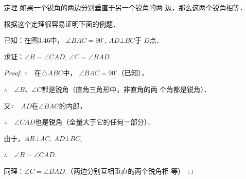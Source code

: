 \begin{blk}
   {定理} 如果一个锐角的两边分别垂直于另一个锐角的两
边，那么这两个锐角相等． 
\end{blk}

根据这个定理很容易证明下面的例题．

\begin{example}
已知：在图3.46中，
$\angle BAC=90^{\circ}$, $AD\bot BC$于
$D$点．

求证：$\angle B=\angle CAD$, $\angle C=\angle BAD$.
\end{example}


\begin{proof}
$\because\quad $在$\triangle ABC$中，
$\angle BAC=90^{\circ}$（已知），

$\therefore\quad \angle B$、$\angle C$都是锐角（直角三角形中，非直角的两
个角都是锐角）．

又$\because\quad AD$在$\angle BAC$的内部，

$\therefore\quad \angle CAD$也是锐角（全量大于它的任何一部分）．

由于，$AB\bot AC$, $AD\bot BC$, 

$\therefore\quad \angle B=\angle CAD$.

同理：$\angle C=\angle BAD$.（两边分别互相垂直的两个锐角相
等）
\end{proof}

\begin{figure}[htp]\centering
    \begin{minipage}[t]{0.48\textwidth}
    \centering
{}
    \caption{}
    \end{minipage}
    \begin{minipage}[t]{0.48\textwidth}
    \centering
    \caption{}
    \end{minipage}
    \end{figure}


